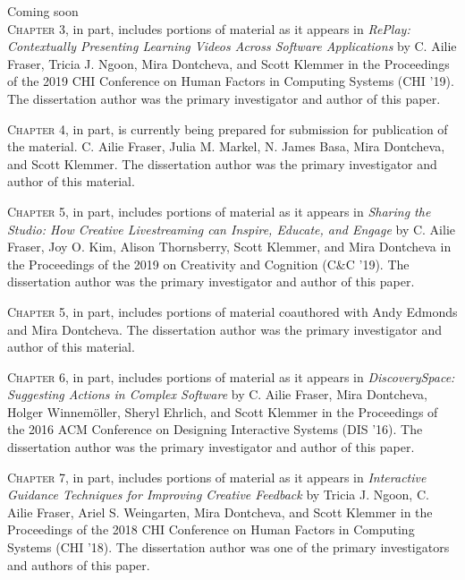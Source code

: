 Coming soon\\

\textsc{Chapter 3}, in part, includes portions of material as it appears in \textit{RePlay: Contextually Presenting Learning Videos Across Software Applications} by C. Ailie Fraser, Tricia J. Ngoon, Mira Dontcheva, and Scott Klemmer in the Proceedings of the 2019 CHI Conference on Human Factors in Computing Systems (CHI '19). The dissertation author was the primary investigator and author of this paper.

\textsc{Chapter 4}, in part, is currently being prepared for submission for publication of the material. C. Ailie Fraser, Julia M. Markel, N. James Basa, Mira Dontcheva, and Scott Klemmer. The dissertation author was the primary investigator and author of this material.

\textsc{Chapter 5}, in part, includes portions of material as it appears in \textit{Sharing the Studio: How Creative Livestreaming can Inspire, Educate, and Engage} by C. Ailie Fraser, Joy O. Kim, Alison Thornsberry, Scott Klemmer, and Mira Dontcheva in the Proceedings of the 2019 on Creativity and Cognition (C\&C '19). The dissertation author was the primary investigator and author of this paper.

\textsc{Chapter 5}, in part, includes portions of material coauthored with Andy Edmonds and Mira Dontcheva. The dissertation author was the primary investigator and author of this material.

\textsc{Chapter 6}, in part, includes portions of material as it appears in \textit{DiscoverySpace: Suggesting Actions in Complex Software} by C. Ailie Fraser, Mira Dontcheva, Holger Winnemöller, Sheryl Ehrlich, and Scott Klemmer in the Proceedings of the 2016 ACM Conference on Designing Interactive Systems (DIS '16). The dissertation author was the primary investigator and author of this paper.

\textsc{Chapter 7}, in part, includes portions of material as it appears in \textit{Interactive Guidance Techniques for Improving Creative Feedback} by Tricia J. Ngoon, C. Ailie Fraser, Ariel S. Weingarten, Mira Dontcheva, and Scott Klemmer in the Proceedings of the 2018 CHI Conference on Human Factors in Computing Systems (CHI '18). The dissertation author was one of the primary investigators and authors of this paper.
